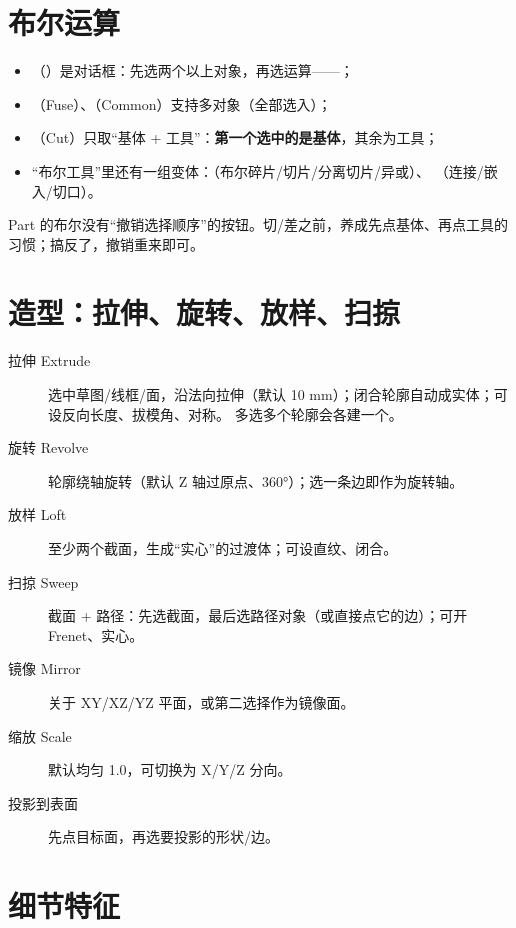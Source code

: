 \section{布尔运算}

\begin{itemize}
  \item {}（）是对话框：先选两个以上对象，再选运算——；
  \item {}（Fuse）、（Common）支持多对象（全部选入）；
  \item {}（Cut）只取“基体 + 工具”：\textbf{第一个选中的是基体}，其余为工具；
  \item “布尔工具”里还有一组变体：（布尔碎片/切片/分离切片/异或）、
        （连接/嵌入/切口）。
\end{itemize}

\begin{warn}[选择顺序决定结果]
Part 的布尔没有“撤销选择顺序”的按钮。切/差之前，养成先点基体、再点工具的习惯；搞反了，撤销重来即可。
\end{warn}

\section{造型：拉伸、旋转、放样、扫掠}

\begin{description}
  \item[拉伸 Extrude] 选中草图/线框/面，沿法向拉伸（默认 10 mm）；闭合轮廓自动成实体；可设反向长度、拔模角、对称。
        多选多个轮廓会各建一个。
  \item[旋转 Revolve] 轮廓绕轴旋转（默认 Z 轴过原点、360°）；选一条边即作为旋转轴。
  \item[放样 Loft] 至少两个截面，生成“实心”的过渡体；可设直纹、闭合。
  \item[扫掠 Sweep] 截面 + 路径：先选截面，最后选路径对象（或直接点它的边）；可开 Frenet、实心。
  \item[镜像 Mirror] 关于 XY/XZ/YZ 平面，或第二选择作为镜像面。
  \item[缩放 Scale] 默认均匀 1.0，可切换为 X/Y/Z 分向。
  \item[投影到表面] 先点目标面，再选要投影的形状/边。
\end{description}

\section{细节特征}

